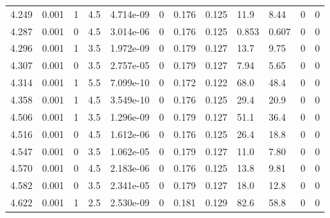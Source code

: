 \documentclass[preview]{standalone}
\begin{document}
{{{{\begin{tabular}{L{1.2cm}C{1.2cm} C{0.3cm}C{0.5cm} C{1.4cm}C{1.4cm} C{1.4cm}C{1.4cm} C{1.6cm}C{1.6cm} C{1.6cm}C{1.6cm}}
  4.249  &  0.001  & 1     & 4.5 &  4.714e-09  & 0  &  0.176&   0.125& 11.9 & 8.44   &  0 & 0  \\ 
  4.287  &  0.001  & 0     & 4.5 &  3.014e-06  & 0  &  0.176&   0.125& 0.853 & 0.607   &  0 & 0  \\ 
  4.296  &  0.001  & 1     & 3.5 &  1.972e-09  & 0  &  0.179&   0.127& 13.7 & 9.75   &  0 & 0  \\ 
  4.307  &  0.001  & 0     & 3.5 &  2.757e-05  & 0  &  0.179&   0.127& 7.94 & 5.65   &  0 & 0  \\ 
  4.314  &  0.001  & 1     & 5.5 &  7.099e-10  & 0  &  0.172&   0.122& 68.0 & 48.4   &  0 & 0  \\ 
  4.358  &  0.001  & 1     & 4.5 &  3.549e-10  & 0  &  0.176&   0.125& 29.4 & 20.9   &  0 & 0  \\ 
  4.506  &  0.001  & 1     & 3.5 &  1.296e-09  & 0  &  0.179&   0.127& 51.1 & 36.4   &  0 & 0  \\ 
  4.516  &  0.001  & 0     & 4.5 &  1.612e-06  & 0  &  0.176&   0.125& 26.4 & 18.8   &  0 & 0  \\ 
  4.547  &  0.001  & 0     & 3.5 &  1.062e-05  & 0  &  0.179&   0.127& 11.0 & 7.80   &  0 & 0  \\ 
  4.570  &  0.001  & 0     & 4.5 &  2.183e-06  & 0  &  0.176&   0.125& 13.8 & 9.81   &  0 & 0  \\ 
  4.582  &  0.001  & 0     & 3.5 &  2.341e-05  & 0  &  0.179&   0.127& 18.0 & 12.8   &  0 & 0  \\ 
  4.622  &  0.001  & 1     & 2.5 &  2.530e-09  & 0  &  0.181&   0.129& 82.6 & 58.8   &  0 & 0  \\ 
\hline 
\end{tabular} 

}}}}
\end{document}
